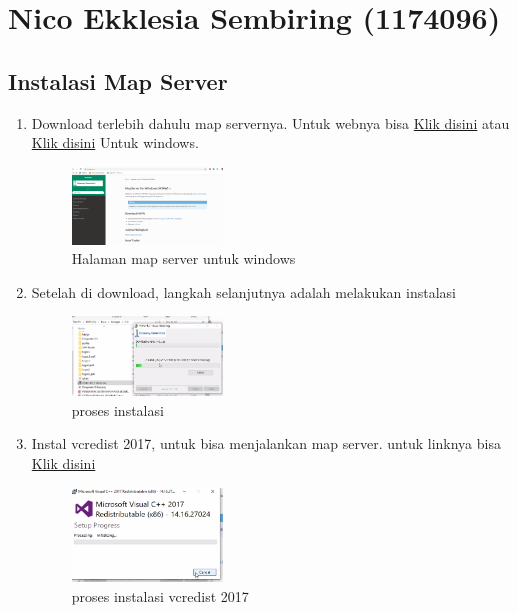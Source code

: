 \section{Nico Ekklesia Sembiring (1174096)}
\subsection{Instalasi Map Server}
\begin{enumerate}
    \item Download terlebih dahulu map servernya. Untuk webnya bisa \href{https://mapserver.org/}{Klik disini} atau \href{https://ms4w.com/}{Klik disini} Untuk windows.
    \hfill\break
    \begin{figure}[H]
		\includegraphics[width=4cm]{figures/1174096/4/g1.PNG}
		\centering
		\caption{Halaman map server untuk windows}
    \end{figure}
    \item Setelah di download, langkah selanjutnya adalah melakukan instalasi
    \hfill\break
    \begin{figure}[H]
		\includegraphics[width=4cm]{figures/1174096/4/g2.png}
		\centering
		\caption{proses instalasi}
    \end{figure}
    \item Instal vcredist 2017, untuk bisa menjalankan map server. untuk linknya bisa \href{https://support.microsoft.com/id-id/help/2977003/the-latest-supported-visual-c-downloads}{Klik disini}
    \hfill\break
    \begin{figure}[H]
		\includegraphics[width=4cm]{figures/1174096/4/g3.png}
		\centering
		\caption{proses instalasi vcredist 2017}
    \end{figure} 
\end{enumerate}
